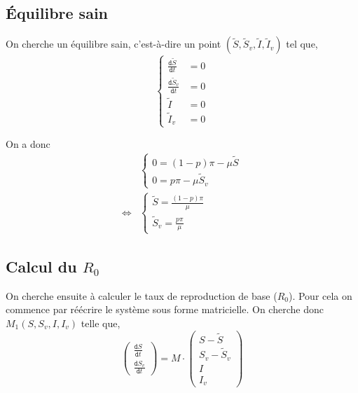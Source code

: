 \documentclass[11pt]{article}
\newcommand{\deriv}{\texttt{d}}
\newcommand{\dt}[1]{\frac{\deriv #1}{\deriv t}}
\newcommand{\ssi}{\Longleftrightarrow}
\begin{document}
\subsection{\'Equilibre sain}
On cherche un \'equilibre sain, c'est-\`a-dire un point $(\tilde S, \tilde S_v, \tilde I, \tilde I_v )$ tel que,
\[
\left\{\begin{aligned}
\dt {\tilde S} &= 0\\ 
\dt {\tilde S_v} &= 0\\
\tilde I &= 0\\
\tilde I_v &= 0
\end{aligned}
\right.
\]

On a donc
\begin{align*}
	&\left\{
	\begin{aligned}
		0 = (1-p) \pi - \mu \tilde S\\
		0 = p\pi - \mu \tilde S_v
	\end{aligned}
	\right.\\
	\ssi & \left\{ 
	\begin{aligned}
		\tilde S = \frac{(1-p) \pi}{\mu }\\
		\tilde S_v = \frac{p\pi}{ \mu }
	\end{aligned}\right.
\end{align*}


\subsection{Calcul du $R_0$}
On cherche ensuite \`a calculer le taux de reproduction de base ($R_0$). Pour cela on commence par r\'e\'ecrire le syst\`eme sous forme matricielle. On cherche donc $M_1(S,S_v,I,I_v)$ telle que,
\[
\begin{pmatrix}
\dt S\\
\dt {S_v} 
\end{pmatrix} =
M \cdot \begin{pmatrix}
S - \tilde S\\
S_v - \tilde S_v\\
I\\
I_v
\end{pmatrix}
\]
\end{document}
